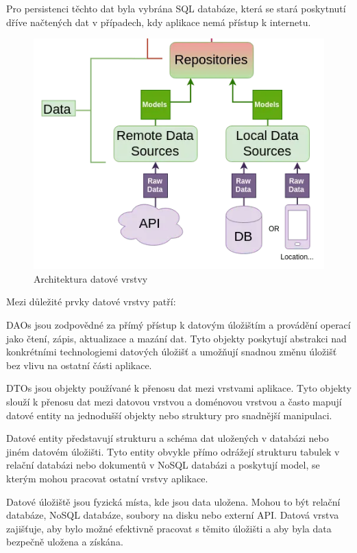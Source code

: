 Pro persistenci těchto dat byla vybrána SQL databáze, která se stará poskytnutí dříve načtených dat v případech, kdy aplikace nemá přístup k internetu.


\begin{figure}[H]
  \centering
  \includegraphics[width=.5\textwidth]{data_layer_diagram.png}
  \caption{Architektura datové vrstvy}
  \label{fig:arch_data_layer}
\end{figure}


Mezi důležité prvky datové vrstvy patří:

DAOs jsou zodpovědné za přímý přístup k datovým úložištím a provádění operací jako čtení, zápis, aktualizace a mazání dat. Tyto objekty 
poskytují abstrakci nad konkrétními technologiemi datových úložišť a umožňují snadnou změnu úložišť bez vlivu na ostatní části aplikace.

DTOs jsou objekty používané k přenosu dat mezi vrstvami aplikace. Tyto objekty slouží k přenosu dat mezi datovou vrstvou a doménovou 
vrstvou a často mapují datové entity na jednodušší objekty nebo struktury pro snadnější manipulaci.

Datové entity představují strukturu a schéma dat uložených v databázi nebo jiném datovém úložišti. Tyto entity obvykle přímo odrážejí
strukturu tabulek v relační databázi nebo dokumentů v NoSQL databázi a poskytují model, se kterým mohou pracovat ostatní vrstvy aplikace.

Datové úložiště jsou fyzická místa, kde jsou data uložena. Mohou to být relační databáze, NoSQL databáze, soubory na disku nebo externí API. 
Datová vrstva zajišťuje, aby bylo možné efektivně pracovat s těmito úložišti a aby byla data bezpečně uložena a získána.

